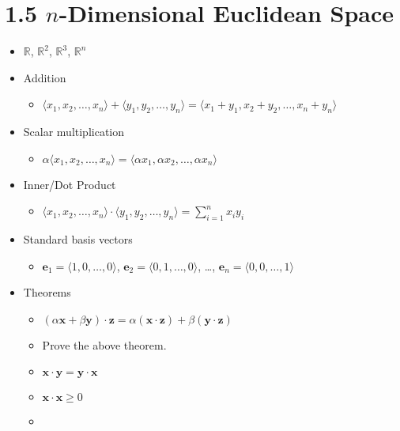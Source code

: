 \documentclass[11pt]{article}
\theoremstyle{plain}
\theoremstyle{definition}
\theoremstyle{remark}
\newcommand{\vect}[1]{\mathbf{#1}}
\newcommand{\<}{\langle}
\renewcommand{\>}{\rangle}
\newcommand{\mb}{\mathbb}
\begin{document}
\section*{1.5 \(n\)-Dimensional Euclidean Space}

\begin{itemize}
  \item \(\mb R\), \(\mb R^2\), \(\mb R^3\), \(\mb R^n\)
  \item Addition
    \begin{itemize}
      \item
        \(
          \<x_1,x_2,\dots,x_n\> + \<y_1,y_2,\dots,y_n\>
            =
          \<x_1+y_1,x_2+y_2,\dots,x_n+y_n\>
        \)
    \end{itemize}
  \item Scalar multiplication
    \begin{itemize}
      \item
        \(
          \alpha\<x_1,x_2,\dots,x_n\>
            =
          \<\alpha x_1,\alpha x_2,\dots,\alpha x_n\>
        \)
    \end{itemize}
  \item Inner/Dot Product
    \begin{itemize}
      \item
        \(
          \<x_1,x_2,\dots,x_n\>\cdot\<y_1,y_2,\dots,y_n\>
            =
          \sum_{i=1}^n x_iy_i
        \)
    \end{itemize}
  \item Standard basis vectors
    \begin{itemize}
      \item
        \(
          \vect{e}_1=\<1,0,\dots,0\>
        \),
        \(
          \vect{e}_2=\<0,1,\dots,0\>
        \), \dots,
        \(
          \vect{e}_n=\<0,0,\dots,1\>
        \)
    \end{itemize}
  \item Theorems
    \begin{itemize}
      \item
        \(
          (\alpha\vect{x}+\beta\vect{y})\cdot\vect{z}
            =
          \alpha(\vect{x}\cdot\vect{z}) + \beta(\vect{y}\cdot\vect{z})
        \)
      \item Prove the above theorem.
      \item
        \(
          \vect{x}\cdot\vect{y}
            =
          \vect{y}\cdot\vect{x}
        \)
      \item
        \(
          \vect{x}\cdot\vect{x} \geq 0
        \)
      \item

\end{itemize}
\end{itemize}
\end{document}
